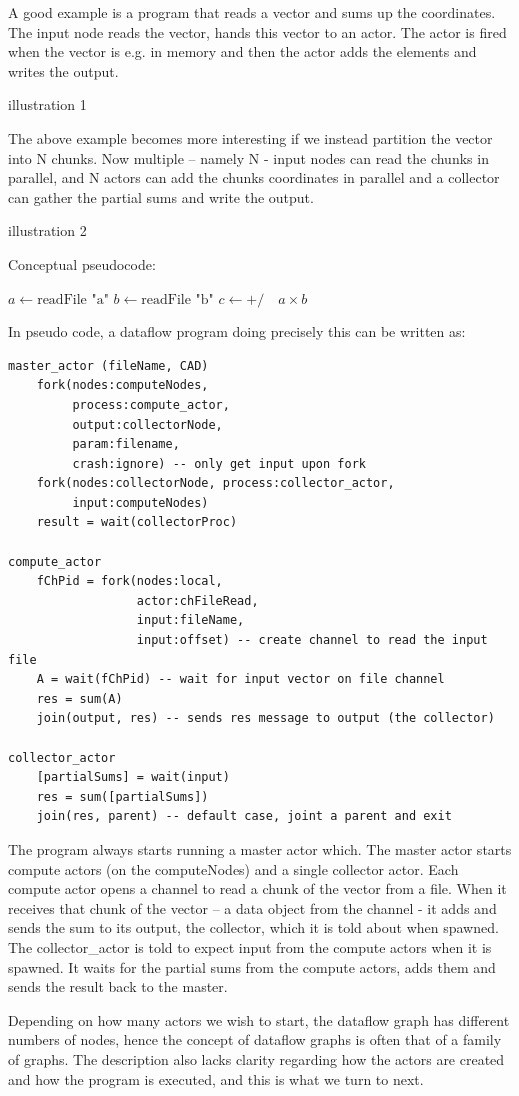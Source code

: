 \documentclass[11pt,a4paper]{article}
\begin{document}
\begin{Example}

A good example is a program that reads a vector and sums up the
 coordinates.  The input node reads the vector, hands this vector to
  an actor.  The actor is fired when the vector is e.g. in memory and
  then the actor adds the elements and writes the output.

illustration 1

The above example becomes more interesting if we instead partition the
vector into N chunks. Now multiple – namely N - input nodes can read
the chunks in parallel, and N actors can add the chunks coordinates in
parallel and a collector can gather the partial sums and write the
output.

illustration 2

Conceptual pseudocode:
\begin{algorithmic}
  \State $a\gets \textrm{readFile "a"}$
  \State $b\gets \textrm{readFile "b"}$
  \State $c\gets  \textrm{+/} \quad a\times b$
\end{algorithmic}

In pseudo code, a dataflow program doing precisely this can be written as:
\begin{lstlisting}
master_actor (fileName, CAD)
    fork(nodes:computeNodes, 
         process:compute_actor, 
         output:collectorNode, 
         param:filename, 
         crash:ignore) -- only get input upon fork
    fork(nodes:collectorNode, process:collector_actor, 
         input:computeNodes)
    result = wait(collectorProc)

compute_actor
    fChPid = fork(nodes:local, 
                  actor:chFileRead, 
                  input:fileName, 
                  input:offset) -- create channel to read the input file
    A = wait(fChPid) -- wait for input vector on file channel
    res = sum(A)
    join(output, res) -- sends res message to output (the collector)
 
collector_actor
    [partialSums] = wait(input)
    res = sum([partialSums])
    join(res, parent) -- default case, joint a parent and exit
\end{lstlisting}

The program always starts running a master actor which. The master
actor starts compute actors (on the computeNodes) and a single
collector actor. Each compute actor opens a channel to read a chunk of
the vector from a file. When it receives that chunk of the vector – a
data object from the channel - it adds and sends the sum to its
output, the collector, which it is told about when spawned.  The
collector\_actor is told to expect input from the compute actors when
it is spawned. It waits for the partial sums from the compute actors,
adds them and sends the result back to the master.

Depending on how many actors we wish to start, the dataflow graph has
different numbers of nodes, hence the concept of dataflow graphs is
often that of a family of graphs.  The description also lacks clarity
regarding how the actors are created and how the program is executed,
and this is what we turn to next.

\end{Example}
\end{document}
